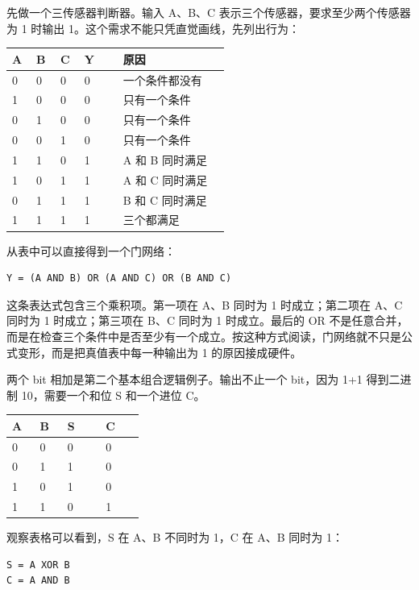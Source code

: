先做一个三传感器判断器。输入 A、B、C 表示三个传感器，要求至少两个传感器为 1 时输出 1。这个需求不能只凭直觉画线，先列出行为：

\begin{longtable}{L{0.1\linewidth}L{0.1\linewidth}L{0.1\linewidth}L{0.16\linewidth}L{0.44\linewidth}}
\toprule
A & B & C & Y & 原因 \\
 & 0 & 0 & 0 & 一个条件都没有 \\
1 & 0 & 0 & 0 & 只有一个条件 \\
0 & 1 & 0 & 0 & 只有一个条件 \\
0 & 0 & 1 & 0 & 只有一个条件 \\
1 & 1 & 0 & 1 & A 和 B 同时满足 \\
1 & 0 & 1 & 1 & A 和 C 同时满足 \\
0 & 1 & 1 & 1 & B 和 C 同时满足 \\
1 & 1 & 1 & 1 & 三个都满足 \\
\bottomrule
\end{longtable}

从表中可以直接得到一个门网络：

\begin{lstlisting}
Y = (A AND B) OR (A AND C) OR (B AND C)
\end{lstlisting}

这条表达式包含三个乘积项。第一项在 A、B 同时为 1 时成立；第二项在 A、C 同时为 1 时成立；第三项在 B、C 同时为 1 时成立。最后的 OR 不是任意合并，而是在检查三个条件中是否至少有一个成立。按这种方式阅读，门网络就不只是公式变形，而是把真值表中每一种输出为 1 的原因接成硬件。

两个 bit 相加是第二个基本组合逻辑例子。输出不止一个 bit，因为 1+1 得到二进制 10，需要一个和位 S 和一个进位 C。

\begin{longtable}{L{0.16\linewidth}L{0.16\linewidth}L{0.22\linewidth}L{0.22\linewidth}}
\toprule
A & B & S & C \\
 & 0 & 0 & 0 \\
0 & 1 & 1 & 0 \\
1 & 0 & 1 & 0 \\
1 & 1 & 0 & 1 \\
\bottomrule
\end{longtable}

观察表格可以看到，S 在 A、B 不同时为 1，C 在 A、B 同时为 1：

\begin{lstlisting}
S = A XOR B
C = A AND B
\end{lstlisting}

